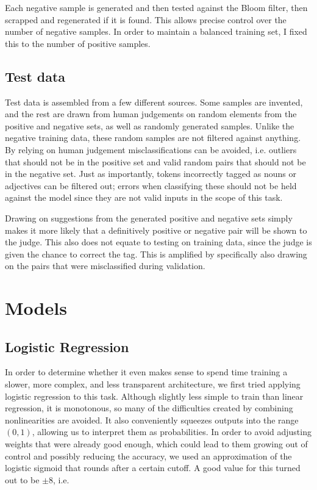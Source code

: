 \documentclass[a4paper, 12pt]{article}
\begin{document}
Each negative sample is generated and then tested against the Bloom filter, then scrapped and regenerated if it is found. This allows precise control over the number of negative samples. In order to maintain a balanced training set, I fixed this to the number of positive samples.

\subsection{Test data}

Test data is assembled from a few different sources. Some samples are invented, and the rest are drawn from human judgements on random elements from the positive and negative sets, as well as randomly generated samples. Unlike the negative training data, these random samples are not filtered against anything. By relying on human judgement misclassifications can be avoided, i.e. outliers that should not be in the positive set and valid random pairs that should not be in the negative set. Just as importantly, tokens incorrectly tagged as nouns or adjectives can be filtered out; errors when classifying these should not be held against the model since they are not valid inputs in the scope of this task.

Drawing on suggestions from the generated positive and negative sets simply makes it more likely that a definitively positive or negative pair will be shown to the judge. This also does not equate to testing on training data, since the judge is given the chance to correct the tag. This is amplified by specifically also drawing on the pairs that were misclassified during validation.


\section{Models}

\subsection{Logistic Regression}
In order to determine whether it even makes sense to spend time training a slower, more complex, and less transparent architecture, we first tried applying logistic regression to this task. Although slightly less simple to train than linear regression, it is monotonous, so many of the difficulties created by combining nonlinearities are avoided. It also conveniently squeezes outputs into the range $ (0, 1) $, allowing us to interpret them as probabilities. In order to avoid adjusting weights that were already good enough, which could lead to them growing out of control and possibly reducing the accuracy, we used an approximation of the logistic sigmoid that rounds after a certain cutoff. A good value for this turned out to be $ \pm 8 $, i.e.
\end{document}
